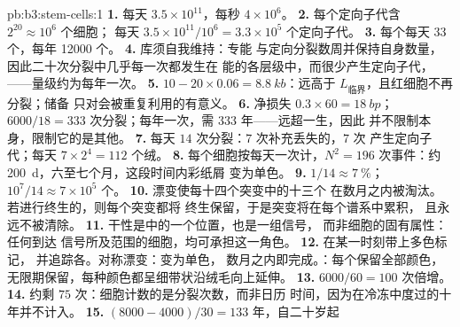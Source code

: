 \begin{solution}{pb:b3:stem-cells:1}
\textbf{1.} 每天 $3.5\times 10^{11}$，每秒 $4\times 10^{6}$。
\textbf{2.} 每个定向子代含 $2^{20} \approx 10^{6}$ 个细胞；
每天 $3.5\times 10^{11}/10^{6} = 3.3\times 10^{5}$ 个定向子代。
\textbf{3.} 每个每天 $33$ 个，每年 \num{12000} 个。
\textbf{4.} 库须自我维持：专能
与定向分裂数周并保持自身数量，
因此二十次分裂中几乎每一次都发生在
能的各层级中，而很少产生定向子代，
——量级约为每年一次。
\textbf{5.} $10 - 20\times 0.06 = \qty{8.8}{kb}$：远高于
$L_{\text{临界}}$，且红细胞不再分裂；储备
只对会被重复利用的有意义。
\textbf{6.} 净损失 $0.3\times 60 = \qty{18}{bp}$；$6000/18 = 333$
次分裂；每年一次，需 $333$ 年——远超一生，因此
并不限制本身，限制它的是其他。
\textbf{7.} 每天 $14$ 次分裂：$7$ 次补充丢失的，$7$ 次
产生定向子代；每天 $7\times 2^{4} = 112$ 个绒。
\textbf{8.} 每个细胞按每天一次计，$N^{2} = 196$ 次事件：约
\qty{200}{d}，六至七个月，这段时间内彩纸屑
变为单色。
\textbf{9.} $1/14 \approx \qty{7}{\%}$；$10^{7}/14 \approx 7\times 10^{5}$
个。
\textbf{10.} 漂变使每十四个突变中的十三个
在数月之内被淘汰。若进行终生的，则每个突变都将
终生保留，于是突变将在每个谱系中累积，
且永远不被清除。
\textbf{11.} 干性是中的一个位置，也是一组信号，
而非细胞的固有属性：任何到达
信号所及范围的细胞，均可承担这一角色。
\textbf{12.} 在某一时刻带上多色标记，
并追踪各。对称漂变：变为单色，
数月之内即完成。：每个保留全部颜色，
无限期保留，每种颜色都呈细带状沿绒毛向上延伸。
\textbf{13.} $6000/60 = 100$ 次倍增。
\textbf{14.} 约剩 $75$ 次：细胞计数的是分裂次数，而非日历
时间，因为在冷冻中度过的十年并不计入。
\textbf{15.} $(8000 - 4000)/30 = 133$ 年，自二十岁起

\end{solution}
